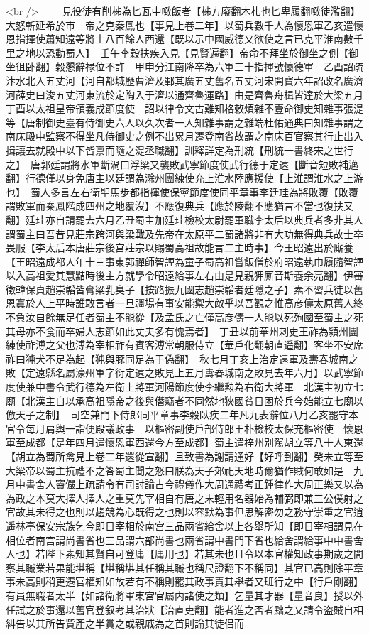 <br />
　　見役徒有削柹為匕瓦中噉飯者【柹方廢翻木札也匕卑履翻噉徒濫翻】大怒斬延希於市　帝之克秦鳳也【事見上卷二年】以蜀兵數千人為懷恩軍乙亥遣懷恩指揮使蕭知遠等將士八百餘人西還【既以示中國威德又欲使之言已克平淮南數千里之地以恐動蜀人】　壬午李穀扶疾入見【見賢遍翻】帝命不拜坐於御坐之側【御坐徂卧翻】穀懇辭禄位不許　甲申分江南降卒為六軍三十指揮號懷德軍　乙酉詔疏汴水北入五丈河【河自都城歷曹濟及鄆其廣五丈舊名五丈河宋開寶六年詔改名廣濟河薛史曰浚五丈河東流於定陶入于濟以通齊魯運路】由是齊魯舟楫皆達於大梁五月丁酉以太祖皇帝領義成節度使　詔以律令文古難知格敇煩雜不壹命御史知雜事張湜等【唐制御史臺有侍御史六人以久次者一人知雜事謂之雜端杜佑通典曰知雜事謂之南床殿中監察不得坐凡侍御史之例不出累月遷登南省故謂之南床百官察其行止出入揖讓去就殿中以下皆禀而隨之湜丞職翻】訓釋詳定為刑統【刑統一書終宋之世行之】　唐郭廷謂將水軍斷渦口浮梁又襲敗武寧節度使武行德于定遠【斷音短敗補邁翻】行德僅以身免唐主以廷謂為滁州團練使充上淮水陸應援使【上淮謂淮水之上游也】　蜀人多言左右衛聖馬步都指揮使保寧節度使同平章事李廷珪為將敗覆【敗覆謂敗軍而秦鳳階成四州之地覆沒】不應復典兵【應於陵翻不應猶言不當也復扶又翻】廷珪亦自請罷去六月乙丑蜀主加廷珪檢校太尉罷軍職李太后以典兵者多非其人謂蜀主曰吾昔見莊宗跨河與梁戰及先帝在太原平二蜀諸將非有大功無得典兵故士卒畏服【李太后本唐莊宗後宫莊宗以賜蜀高祖故能言二主時事】今王昭遠出於廝養【王昭遠成都人年十三事東郭禪師智諲為童子蜀高祖嘗飯僧於府昭遠執巾履隨智諲以入高祖愛其慧黠時後主方就學令昭遠給事左右由是見親狎厮音斯養余亮翻】伊審徵韓保貞趙崇韜皆膏粱乳臭子【按路振九國志趙崇韜者廷隱之子】素不習兵徒以舊恩寘於人上平時誰敢言者一旦疆場有事安能禦大敵乎以吾觀之惟高彦儔太原舊人終不負汝自餘無足任者蜀主不能從【及孟氏之亡僅高彦儔一人能以死殉國至蜀主之死其母亦不食而卒婦人志節如此丈夫多有愧焉者】　丁丑以前華州刺史王祚為潁州團練使祚溥之父也溥為宰相祚有賓客溥常朝服侍立【華戶化翻朝直遥翻】客坐不安席祚曰㹠犬不足為起【㹠與豚同足為于偽翻】　秋七月丁亥上治定遠軍及夀春城南之敗【定遠縣名屬濠州軍字衍定遠之敗見上五月夀春城南之敗見去年六月】以武寧節度使兼中書令武行德為左衛上將軍河陽節度使李繼勲為右衛大將軍　北漢主初立七廟【北漢主自以承高祖隱帝之後與僭竊者不同然地狹國貧日困於兵今始能立七廟以倣天子之制】　司空兼門下侍郎同平章事李穀臥疾二年凡九表辭位八月乙亥罷守本官令每月肩輿一詣便殿議政事　以樞密副使戶部侍郎王朴檢校太保充樞密使　懷恩軍至成都【是年四月遣懷恩軍西還今方至成都】蜀主遣梓州别駕胡立等八十人東還【胡立為蜀所禽見上卷二年還從宣翻】且致書為謝請通好【好呼到翻】癸未立等至大梁帝以蜀主抗禮不之答蜀主聞之怒曰朕為天子郊祀天地時爾猶作賊何敢如是　九月中書舍人竇儼上疏請令有司討論古今禮儀作大周通禮考正鍾律作大周正樂又以為為政之本莫大擇人擇人之重莫先宰相自有唐之末輕用名器始為輔弼即兼三公僕射之官故其未得之也則以趨競為心既得之也則以容默為事但思解密勿之務守崇重之官逍遥林亭保安宗族乞今即日宰相於南宫三品兩省給舍以上各舉所知【即日宰相謂見在相位者南宫謂尚書省也三品謂六部尚書也兩省謂中書門下省也給舍謂給事中中書舍人也】若陛下素知其賢自可登庸【庸用也】若其未也且令以本官權知政事期歲之間察其職業若果能堪稱【堪稱堪其任稱其職也稱尺證翻下不稱同】其官已高則除平章事未高則稍更遷官權知如故若有不稱則罷其政事責其舉者又班行之中【行戶剛翻】有員無職者太半【如諸衛將軍東宮官屬内諸使之類】乞量其才器【量音良】授以外任試之於事還以舊官登叙考其治狀【治直吏翻】能者進之否者黜之又請令盗賊自相糾告以其所告貲產之半賞之或親戚為之首則論其徒侣而